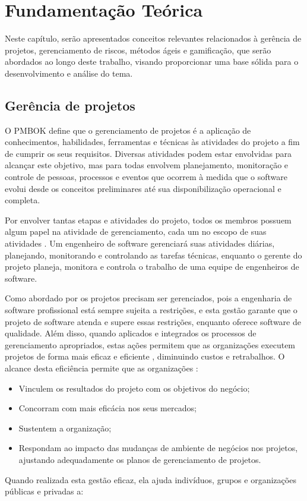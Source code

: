 \documentclass[
	12pt,
	openright,
	twoside,
	a4paper,
	english,
	brazil
	]{abntex2}
\begin{document}

\chapter{Fundamentação Teórica} %

Neste capítulo, serão apresentados conceitos relevantes relacionados à gerência de projetos, gerenciamento de riscos, métodos ágeis e gamificação, que serão abordados ao longo deste trabalho, visando proporcionar uma base sólida para o desenvolvimento e análise do tema.

\section{Gerência de projetos}

O PMBOK \cite{PMBOK} define que o gerenciamento de projetos é a aplicação de conhecimentos, habilidades, ferramentas e técnicas às atividades do projeto a fim de cumprir os seus requisitos. Diversas atividades podem estar envolvidas para alcançar este objetivo, mas para  todas envolvem planejamento, monitoração e controle de pessoas, processos e eventos que ocorrem à medida que o software evolui desde os conceitos preliminares até sua disponibilização operacional e completa.

Por envolver tantas etapas e atividades do projeto, todos os membros possuem algum papel na atividade de gerenciamento, cada um no escopo de suas atividades \cite{Pressman_2014}. Um engenheiro de software gerenciará suas atividades diárias, planejando, monitorando e controlando as tarefas técnicas, enquanto o gerente do projeto planeja, monitora e controla o trabalho de uma equipe de engenheiros de software.

Como abordado por  os projetos precisam ser gerenciados, pois a engenharia de software profissional está sempre sujeita a restrições, e esta gestão garante que o projeto de software atenda e supere essas restrições, enquanto oferece software de qualidade. Além disso, quando aplicados e integrados os processos de gerenciamento apropriados, estas ações permitem que as organizações executem projetos de forma mais eficaz e eficiente \cite{PMBOK}, diminuindo custos e retrabalhos. O alcance desta eficiência permite que as organizações \cite{PMBOK}:

\begin{itemize}
  \item Vinculem os resultados do projeto com os objetivos do negócio;
  \item Concorram com mais eficácia nos seus mercados;
  \item Sustentem a organização;
  \item Respondam ao impacto das mudanças de ambiente de negócios nos projetos, ajustando adequadamente os planos de gerenciamento de projetos.
\end{itemize}
Quando realizada esta gestão eficaz, ela ajuda indivíduos, grupos e organizações públicas e privadas a:
\end{document}

